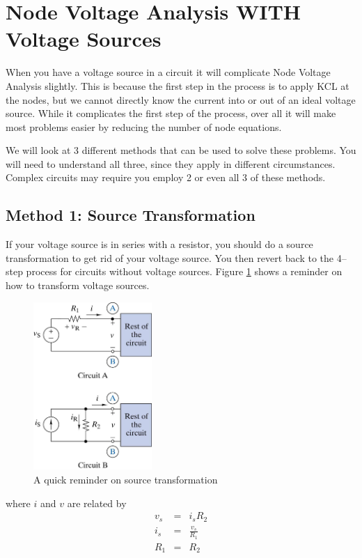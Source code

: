\documentclass{handout}
\begin{document}
\section{Node Voltage Analysis WITH Voltage Sources}
When you have a voltage source in a circuit it will complicate Node Voltage Analysis slightly.  This is because the first step in the process is to apply KCL at the nodes, but we cannot directly know the current into or out of an ideal voltage source. While it complicates the first step of the process, over all it will make most problems easier by reducing the number of node equations.

We will look at 3 different methods that can be used to solve these problems.  You will need to  understand all three, since they apply in different circumstances. Complex circuits may require you employ 2 or even all 3 of these methods.

\subsection{Method 1: Source Transformation}
If your voltage source is in series with a resistor, you should do a source transformation to get rid of your voltage source.  You then revert back to the 4--step process for circuits without voltage sources. Figure \ref{fig: SourceTransformation} shows a reminder on how to transform voltage sources.
\begin{figure} [h t b]
\centering
\includegraphics[width=0.4\textwidth]{SourceTransformation.jpg}
\caption{A quick reminder on source transformation}
\label{fig: SourceTransformation}
\end{figure}

where $i$ and $v$ are related by	
\begin{eqnarray}
v_s &=& i_sR_2 \nonumber \\
i_s &=& \frac{v_s}{R_1} \nonumber \\
R_1 &=& R_2 \nonumber 
\end{eqnarray} 
\newpage
\pagebreak
\clearpage
\end{document}

